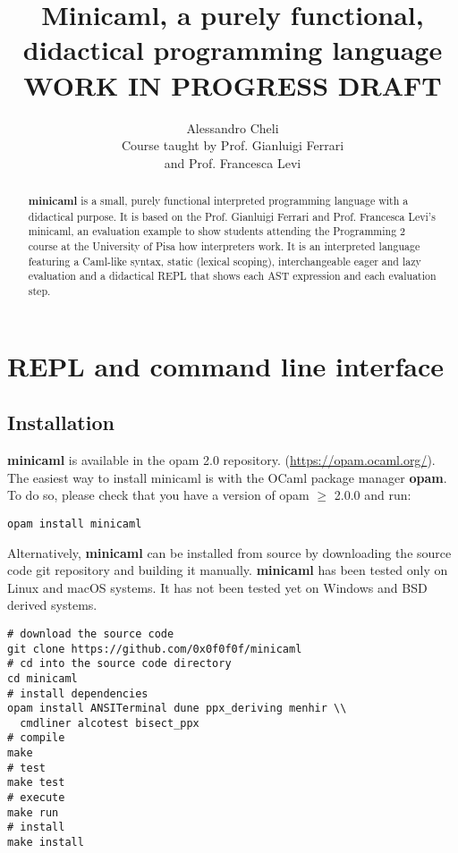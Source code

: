 \documentclass[a4paper, 11pt]{article}
\title{Minicaml, a purely functional, didactical programming language\\WORK IN PROGRESS DRAFT}
\author{Alessandro Cheli\\Course taught by Prof. Gianluigi Ferrari\\and Prof. Francesca Levi}
\theoremstyle{plain}%
\theoremstyle{definition}
\theoremstyle{remark}
\begin{document}
\maketitle

\begin{abstract}
\textbf{minicaml} is a small, purely functional interpreted programming language
with a didactical purpose. It is based on the Prof. Gianluigi Ferrari and Prof.
Francesca Levi's minicaml, an evaluation example to show students attending the
Programming 2 course at the University of Pisa how interpreters work. It is an
interpreted language featuring a Caml-like syntax, static (lexical scoping),
interchangeable eager and lazy evaluation and a didactical REPL that
shows each AST expression and each evaluation step.
\end{abstract}

\section{REPL and command line interface}
\subsection{Installation}
\textbf{minicaml} is available in the opam 2.0 repository.
(\url{https://opam.ocaml.org/}). The easiest way to install minicaml is with the
OCaml package manager \textbf{opam}. To do so, please check that you have a version of opam $\geq$
2.0.0 and run:
\begin{lstlisting}[style=bash]
opam install minicaml
\end{lstlisting}
Alternatively, \textbf{minicaml} can be installed from source by downloading the
source code git repository and building it manually. \textbf{minicaml} has been tested
only on Linux and macOS systems. It has not been tested yet on Windows and BSD
derived systems.
\begin{lstlisting}[style=bash]
# download the source code
git clone https://github.com/0x0f0f0f/minicaml
# cd into the source code directory
cd minicaml
# install dependencies
opam install ANSITerminal dune ppx_deriving menhir \\
  cmdliner alcotest bisect_ppx
# compile
make
# test
make test
# execute
make run
# install
make install
\end{lstlisting}

\clearpage
\end{document}
